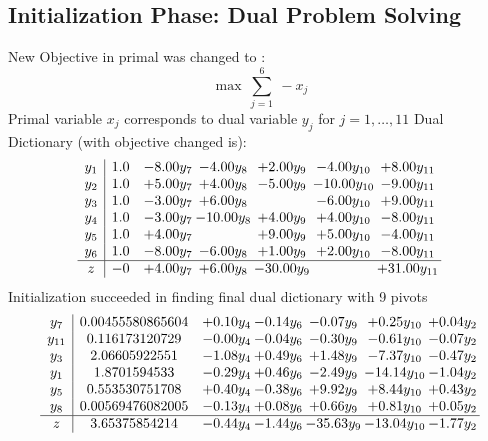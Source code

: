 \documentclass[8pt]{article}
\begin{document}
\subsection{Initialization Phase: Dual Problem Solving}
New Objective in primal was changed to : \[ \max\ \sum_{j=1}^{6}\ - x_j \] 
Primal variable $x_j$ corresponds to dual variable $y_j$ for $j = 1,\ldots,11$
Dual Dictionary (with objective changed is): 
\[\begin{array}{c| c c@{\hskip 2pt} c@{\hskip 2pt} c@{\hskip 2pt} c@{\hskip 2pt} c@{\hskip 2pt} }
 y_{1}   &  1.0 & -8.00 y_{7} & -4.00 y_{8} & +  2.00 y_{9} & -4.00 y_{10} & +  8.00 y_{11}\\
 y_{2}   &  1.0 & +  5.00 y_{7} & +  4.00 y_{8} & -5.00 y_{9} & -10.00 y_{10} & -9.00 y_{11}\\
 y_{3}   &  1.0 & -3.00 y_{7} & +  6.00 y_{8} &   & -6.00 y_{10} & +  9.00 y_{11}\\
 y_{4}   &  1.0 & -3.00 y_{7} & -10.00 y_{8} & +  4.00 y_{9} & +  4.00 y_{10} & -8.00 y_{11}\\
 y_{5}   &  1.0 & +  4.00 y_{7} &   & +  9.00 y_{9} & +  5.00 y_{10} & -4.00 y_{11}\\
 y_{6}   &  1.0 & -8.00 y_{7} & -6.00 y_{8} & +  1.00 y_{9} & +  2.00 y_{10} & -8.00 y_{11}\\
\hline
z    &  -0 & +  4.00 y_{7} & +  6.00 y_{8} & -30.00 y_{9} &   & + 31.00 y_{11}\\
\end{array}\]
Initialization succeeded in finding final dual dictionary with 9 pivots
\[\begin{array}{c| c c@{\hskip 2pt} c@{\hskip 2pt} c@{\hskip 2pt} c@{\hskip 2pt} c@{\hskip 2pt} }
 y_{7}   &  0.00455580865604 & +  0.10 y_{4} & -0.14 y_{6} & -0.07 y_{9} & +  0.25 y_{10} & +  0.04 y_{2}\\
 y_{11}   &  0.116173120729 & -0.00 y_{4} & -0.04 y_{6} & -0.30 y_{9} & -0.61 y_{10} & -0.07 y_{2}\\
 y_{3}   &  2.06605922551 & -1.08 y_{4} & +  0.49 y_{6} & +  1.48 y_{9} & -7.37 y_{10} & -0.47 y_{2}\\
 y_{1}   &  1.8701594533 & -0.29 y_{4} & +  0.46 y_{6} & -2.49 y_{9} & -14.14 y_{10} & -1.04 y_{2}\\
 y_{5}   &  0.553530751708 & +  0.40 y_{4} & -0.38 y_{6} & +  9.92 y_{9} & +  8.44 y_{10} & +  0.43 y_{2}\\
 y_{8}   &  0.00569476082005 & -0.13 y_{4} & +  0.08 y_{6} & +  0.66 y_{9} & +  0.81 y_{10} & +  0.05 y_{2}\\
\hline
z    &  3.65375854214 & -0.44 y_{4} & -1.44 y_{6} & -35.63 y_{9} & -13.04 y_{10} & -1.77 y_{2}\\
\end{array}\]
\end{document}
